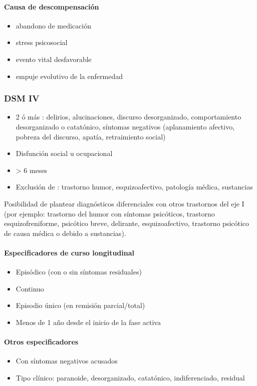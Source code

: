 \paragraph*{Causa de descompensación}
\begin{itemize}
    \item abandono de medicación
    \item stress psicosocial
    \item evento vital desfavorable
    \item empuje evolutivo de la enfermedad
\end{itemize}
\subsubsection*{DSM IV}
\begin{itemize}
    \item 2 ó más : delirios, alucinaciones, discurso desorganizado, comportamiento desorganizado o catatónico, síntomas negativos (aplanamiento afectivo, pobreza del discurso, apatía, retraimiento social)
    \item Disfunción social u ocupacional
    \item > 6 meses
    \item Exclusión de : trastorno humor, esquizoafectivo, patología médica, sustancias
\end{itemize}
Posibilidad de plantear diagnósticos diferenciales con otros trastornos del eje I (por ejemplo: trastorno del humor con síntomas psicóticos, trastorno esquizofreniforme, psicótico breve, delirante, esquizoafectivo, trastorno psicótico de causa médica o debido a sustancias).

\paragraph*{Especificadores de curso longitudinal}
\begin{itemize}
 \item Episódico (con o sin síntomas residuales)
 \item Continuo
 \item Episodio único (en remisión parcial/total)
 \item Menos de 1 año desde el inicio de la fase activa
\end{itemize}
\paragraph*{Otros especificadores}
\begin{itemize}
 \item Con síntomas negativos acusados
 \item Tipo clínico: paranoide, desorganizado, catatónico, indiferenciado, residual
\end{itemize}
